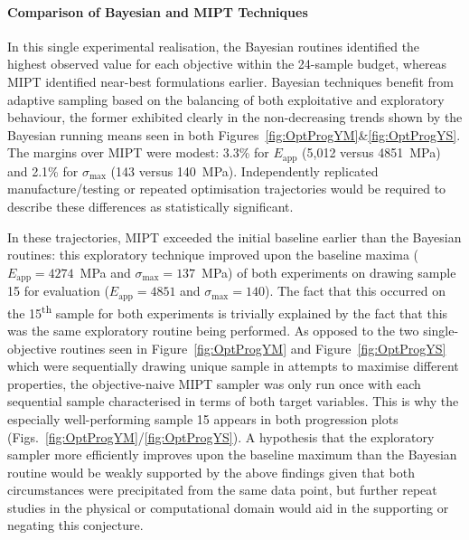 \paragraph{Comparison of Bayesian and MIPT Techniques}
In this single experimental realisation, the Bayesian routines identified the
 highest observed value for each objective within the 24-sample budget, whereas 
 MIPT identified near-best formulations earlier.
Bayesian techniques benefit from adaptive sampling based on the
 balancing of both exploitative and exploratory behaviour, the former 
 exhibited clearly in the non-decreasing trends shown by the Bayesian 
 running means seen in both Figures~\ref{fig:OptProgYM}\&\ref{fig:OptProgYS}.
The margins over MIPT were modest: 3.3\% for \(E_{\text{app}}\) (5,012 versus 
 4851~\unit{\mega\pascal}) and 2.1\% for \(\sigma_{\text{max}}\) (143 versus 
 140~\unit{\mega\pascal}).
Independently replicated manufacture/testing or repeated optimisation trajectories 
 would be required to describe these differences as statistically significant.

In these trajectories, MIPT exceeded the initial baseline earlier than the
 Bayesian routines: this exploratory technique improved upon the baseline maxima 
 (\(E_{\text{app}}=4274\)~\unit{\mega\pascal} and \(\sigma_{\text{max}}=137\)~\unit{\mega\pascal}) 
 of both experiments on drawing sample 15 for evaluation (\(E_{\text{app}}=4851\) and
 \(\sigma_{\text{max}}=140\)).
The fact that this occurred on the 15\textsuperscript{th} sample for both
 experiments is trivially explained by the fact that this was the same 
 exploratory routine being performed.
As opposed to the two single-objective routines seen in Figure~\ref{fig:OptProgYM}
 and Figure~\ref{fig:OptProgYS} which were sequentially drawing unique sample in attempts
 to maximise different properties, the objective-naive MIPT sampler was 
 only run once with each sequential sample characterised in terms of both
 target variables.
This is why the especially well-performing sample 15 appears in both 
 progression plots (Figs.~\ref{fig:OptProgYM}/\ref{fig:OptProgYS}).
A hypothesis that the exploratory sampler more efficiently improves upon
 the baseline maximum than the Bayesian routine would be weakly supported
 by the above findings given that both circumstances were precipitated from
 the same data point, but further repeat studies in the physical or
 computational domain would aid in the supporting or negating this
 conjecture.

